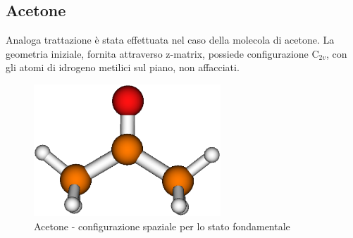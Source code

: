 \subsection{Acetone}

Analoga trattazione \`e stata effettuata nel caso della molecola di acetone.
La geometria iniziale, fornita attraverso z-matrix, possiede configurazione C$_{2v}$,
con gli atomi di idrogeno metilici sul piano, non affacciati.

\begin{figure}[ht]
\begin{center}
\includegraphics[angle=270,width=7cm,keepaspectratio]{immagini/acetone/geom.eps}
\parbox[h]{12cm}{
\caption{\small Acetone - configurazione spaziale per lo stato fondamentale}
\label{fig:acetone_geom}
}
\end{center}
\end{figure}

